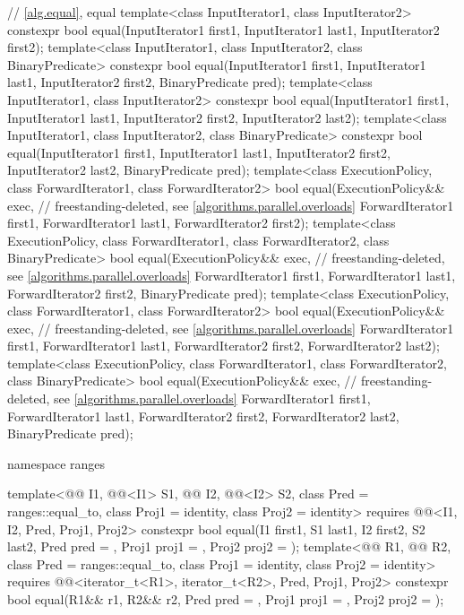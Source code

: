 \begin{codeblock}
{  // \ref{alg.equal}, equal
  template<class InputIterator1, class InputIterator2>
    constexpr bool equal(InputIterator1 first1, InputIterator1 last1,
                         InputIterator2 first2);
  template<class InputIterator1, class InputIterator2, class BinaryPredicate>
    constexpr bool equal(InputIterator1 first1, InputIterator1 last1,
                         InputIterator2 first2, BinaryPredicate pred);
  template<class InputIterator1, class InputIterator2>
    constexpr bool equal(InputIterator1 first1, InputIterator1 last1,
                         InputIterator2 first2, InputIterator2 last2);
  template<class InputIterator1, class InputIterator2, class BinaryPredicate>
    constexpr bool equal(InputIterator1 first1, InputIterator1 last1,
                         InputIterator2 first2, InputIterator2 last2,
                         BinaryPredicate pred);
  template<class ExecutionPolicy, class ForwardIterator1, class ForwardIterator2>
    bool equal(ExecutionPolicy&& exec,                          // freestanding-deleted, see \ref{algorithms.parallel.overloads}
               ForwardIterator1 first1, ForwardIterator1 last1,
               ForwardIterator2 first2);
  template<class ExecutionPolicy, class ForwardIterator1, class ForwardIterator2,
           class BinaryPredicate>
    bool equal(ExecutionPolicy&& exec,                          // freestanding-deleted, see \ref{algorithms.parallel.overloads}
               ForwardIterator1 first1, ForwardIterator1 last1,
               ForwardIterator2 first2, BinaryPredicate pred);
  template<class ExecutionPolicy, class ForwardIterator1, class ForwardIterator2>
    bool equal(ExecutionPolicy&& exec,                          // freestanding-deleted, see \ref{algorithms.parallel.overloads}
               ForwardIterator1 first1, ForwardIterator1 last1,
               ForwardIterator2 first2, ForwardIterator2 last2);
  template<class ExecutionPolicy, class ForwardIterator1, class ForwardIterator2,
           class BinaryPredicate>
    bool equal(ExecutionPolicy&& exec,                          // freestanding-deleted, see \ref{algorithms.parallel.overloads}
               ForwardIterator1 first1, ForwardIterator1 last1,
               ForwardIterator2 first2, ForwardIterator2 last2,
               BinaryPredicate pred);

  namespace ranges {
    template<@@ I1, @@<I1> S1, @@ I2, @@<I2> S2,
             class Pred = ranges::equal_to, class Proj1 = identity, class Proj2 = identity>
      requires @@<I1, I2, Pred, Proj1, Proj2>
      constexpr bool equal(I1 first1, S1 last1, I2 first2, S2 last2,
                           Pred pred = {},
                           Proj1 proj1 = {}, Proj2 proj2 = {});
    template<@@ R1, @@ R2, class Pred = ranges::equal_to,
             class Proj1 = identity, class Proj2 = identity>
      requires @@<iterator_t<R1>, iterator_t<R2>, Pred, Proj1, Proj2>
      constexpr bool equal(R1&& r1, R2&& r2, Pred pred = {},
                           Proj1 proj1 = {}, Proj2 proj2 = {});

}}
\end{codeblock}
